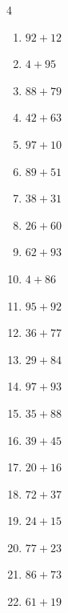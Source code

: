 \begin{multicols}{4}
\begin{enumerate}
  \item $92+12$
        \phantom{$=104$}

  \item $4+95$
        \phantom{$=99$}

  \item $88+79$
        \phantom{$=167$}

  \item $42+63$
        \phantom{$=105$}

  \item $97+10$
        \phantom{$=107$}

  \item $89+51$
        \phantom{$=140$}

  \item $38+31$
        \phantom{$=69$}

  \item $26+60$
        \phantom{$=86$}

  \item $62+93$
        \phantom{$=155$}

  \item $4+86$
        \phantom{$=90$}

  \item $95+92$
        \phantom{$=187$}

  \item $36+77$
        \phantom{$=113$}

  \item $29+84$
        \phantom{$=113$}

  \item $97+93$
        \phantom{$=190$}

  \item $35+88$
        \phantom{$=123$}

  \item $39+45$
        \phantom{$=84$}

  \item $20+16$
        \phantom{$=36$}

  \item $72+37$
        \phantom{$=109$}

  \item $24+15$
        \phantom{$=39$}

  \item $77+23$
        \phantom{$=100$}

  \item $86+73$
        \phantom{$=159$}

  \item $61+19$
        \phantom{$=80$}


\end{enumerate}
\end{multicols}
